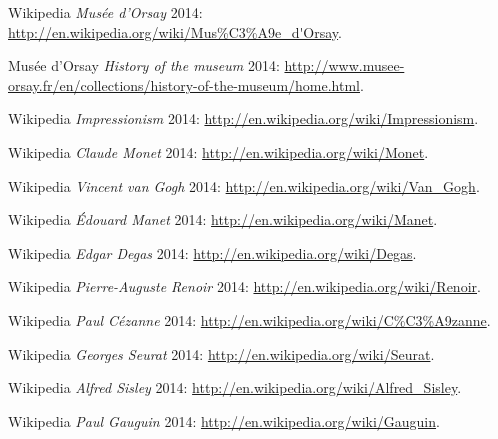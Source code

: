 \documentclass[
10pt, %
a4paper, %
oneside, %
headinclude,footinclude, %
BCOR5mm, %
]{scrartcl}
\theoremstyle{definition} %
\theoremstyle{plain} %
\theoremstyle{remark} %
\begin{document}

\renewcommand{\refname}{\spacedlowsmallcaps{References}} %

%


\begin{thebibliography}{10}

  Wikipedia {\em Musée d'Orsay}  2014: \url{http://en.wikipedia.org/wiki/Mus\%C3\%A9e_d'Orsay}.
 
  Musée d'Orsay {\em History of the museum}  2014: \url{http://www.musee-orsay.fr/en/collections/history-of-the-museum/home.html}.
 
 Wikipedia {\em Impressionism}  2014: \url{http://en.wikipedia.org/wiki/Impressionism}.

 Wikipedia {\em Claude Monet}  2014: \url{http://en.wikipedia.org/wiki/Monet}.

 Wikipedia {\em Vincent van Gogh}  2014: \url{http://en.wikipedia.org/wiki/Van_Gogh}.

 Wikipedia {\em Édouard Manet}  2014: \url{http://en.wikipedia.org/wiki/Manet}.

 Wikipedia {\em Edgar Degas}  2014: \url{http://en.wikipedia.org/wiki/Degas}.

 Wikipedia {\em Pierre-Auguste Renoir}  2014: \url{http://en.wikipedia.org/wiki/Renoir}.

 Wikipedia {\em Paul Cézanne}  2014: \url{http://en.wikipedia.org/wiki/C%C3%A9zanne}.

 Wikipedia {\em Georges Seurat}  2014: \url{http://en.wikipedia.org/wiki/Seurat}.

 Wikipedia {\em Alfred Sisley}  2014: \url{http://en.wikipedia.org/wiki/Alfred_Sisley}.

 Wikipedia {\em Paul Gauguin}  2014: \url{http://en.wikipedia.org/wiki/Gauguin}.


\end{thebibliography}
\end{document}
